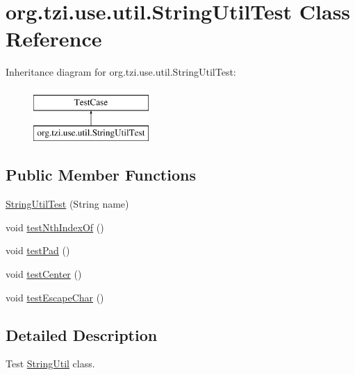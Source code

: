 \hypertarget{classorg_1_1tzi_1_1use_1_1util_1_1_string_util_test}{\section{org.\-tzi.\-use.\-util.\-String\-Util\-Test Class Reference}
\label{classorg_1_1tzi_1_1use_1_1util_1_1_string_util_test}
}
Inheritance diagram for org.\-tzi.\-use.\-util.\-String\-Util\-Test\-:\begin{figure}[H]
\begin{center}
\leavevmode
\includegraphics[height=2.000000cm]{classorg_1_1tzi_1_1use_1_1util_1_1_string_util_test}
\end{center}
\end{figure}
\subsection*{Public Member Functions}
\begin{DoxyCompactItemize}
\item 
\hyperlink{classorg_1_1tzi_1_1use_1_1util_1_1_string_util_test_ac0e65addab8d005f943e78b7c6cfd4b7}{String\-Util\-Test} (String name)
\item 
void \hyperlink{classorg_1_1tzi_1_1use_1_1util_1_1_string_util_test_a9b768453099447bc169085ccca75b7ae}{test\-Nth\-Index\-Of} ()
\item 
void \hyperlink{classorg_1_1tzi_1_1use_1_1util_1_1_string_util_test_ae7321c5aa1345487f40e5a56d2209975}{test\-Pad} ()
\item 
void \hyperlink{classorg_1_1tzi_1_1use_1_1util_1_1_string_util_test_a703f4e348146240c7d4624fb25f73f11}{test\-Center} ()
\item 
void \hyperlink{classorg_1_1tzi_1_1use_1_1util_1_1_string_util_test_a780cc51aea8c902acbd9cec11e4732d0}{test\-Escape\-Char} ()
\end{DoxyCompactItemize}


\subsection{Detailed Description}
Test \hyperlink{classorg_1_1tzi_1_1use_1_1util_1_1_string_util}{String\-Util} class.

